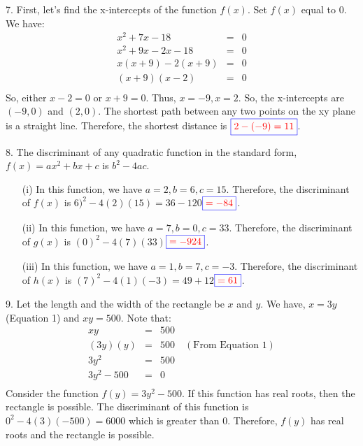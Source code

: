 \documentclass[addpoints, 12pt]{exam}
\theoremstyle{remark}
\begin{document}
7. First, let's find the x-intercepts of the function $f(x)$. Set $f(x)$ equal to 0. We have:
\begin{eqnarray*}
    x^2+7x-18 & = & 0 \\
    x^2+9x-2x-18 & = & 0 \\
    x(x+9)-2(x+9) & = & 0 \\
    (x+9)(x-2) & = & 0 \\
\end{eqnarray*}
So, either $x-2=0$ or $x+9=0$. Thus, $x = -9, x=2$. So, the x-intercepts are $(-9, 0)$ and $(2, 0)$. The shortest path between any two points on the xy plane is a straight line. Therefore, the shortest distance is {\boldmath $\textcolor{blue}{\boxed{\textcolor{red}{2-(-9) = 11}}}$}.
\newline

8. The discriminant of any quadratic function in the standard form, $f(x) = ax^2 + bx + c$ is $b^2 - 4ac$.
\begin{enumerate}
    \item [(i)] In this function, we have $a = 2, b = 6, c=15$. Therefore, the discriminant of $f(x)$ is $6)^2 - 4(2)(15) = 36 - 120${\boldmath $\textcolor{blue}{\boxed{\textcolor{red}{ = -84}}}$}.
    \item[(ii)] In this function, we have $a = 7, b = 0, c=33$. Therefore, the discriminant of $g(x)$ is $(0)^2 - 4(7)(33)${\boldmath $\textcolor{blue}{\boxed{\textcolor{red}{ = -924}}}$}.
    \item[(iii)] In this function, we have $a = 1, b = 7, c=-3$. Therefore, the discriminant of $h(x)$ is $(7)^2 - 4(1)(-3) = 49 + 12${\boldmath $\textcolor{blue}{\boxed{\textcolor{red}{ = 61}}}$}.
    \newline
\end{enumerate}

9. Let the length and the width of the rectangle be $x$ and $y$. We have, $x=3y$ (Equation 1) and $xy=500$. Note that:
\begin{eqnarray*}
    xy & = & 500 \\
    (3y)(y) & = & 500 \quad (\text{From Equation 1})\\
    3y^2 & = & 500 \\
    3y^2-500 & = & 0 \\
\end{eqnarray*}
Consider the function $f(y) = 3y^2-500$. If this function has real roots, then the rectangle is possible. The discriminant of this function is $0^2-4(3)(-500) = 6000$ which is greater than 0. Therefore, $f(y)$ has real roots and the rectangle is possible.
\newline
\end{document}
